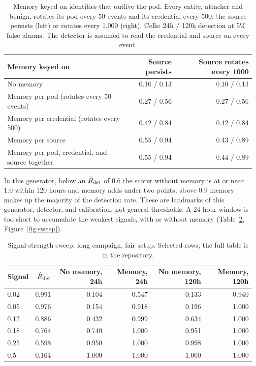 \documentclass[11pt,letterpaper]{article}
\begin{document}
\begin{table}[H]\centering\small
\begin{tabular}{lrr}
\toprule
Memory keyed on & Source persists & Source rotates every 1000 \\
\midrule
No memory & 0.10 / 0.13 & 0.10 / 0.13 \\
Memory per pod (rotates every 50 events) & 0.27 / 0.56 & 0.27 / 0.56 \\
Memory per credential (rotates every 500) & 0.42 / 0.84 & 0.42 / 0.84 \\
Memory per source & 0.55 / 0.94 & 0.43 / 0.89 \\
Memory per pod, credential, and source together & 0.55 / 0.94 & 0.44 / 0.89 \\
\bottomrule
\end{tabular}
\caption{Memory keyed on identities that outlive the pod. Every entity, attacker and benign, rotates its pod every 50 events and its credential every 500; the source persists (left) or rotates every 1,000 (right). Cells: 24h / 120h detection at 5\% false alarms. The detector is assumed to read the credential and source on every event.}\label{tab:keys}
\end{table}

In this generator, below an $\hat R_{\rm det}$ of 0.6 the scorer without memory is at or near 1.0 within 120 hours and memory adds under two points; above 0.9 memory makes up the majority of the detection rate. These are landmarks of this generator, detector, and calibration, not general thresholds. A 24-hour window is too short to accumulate the weakest signals, with or without memory (Table~\ref{tab:sweep}, Figure~\ref{fig:sweep}).

\begin{table}[H]\centering\small
\begin{tabular}{lrrrrr}
\toprule
Signal & $\hat R_{\rm det}$ & No memory, 24h & Memory, 24h & No memory, 120h & Memory, 120h \\
\midrule
0.02 & 0.991 & 0.104 & 0.547 & 0.133 & 0.940 \\
0.05 & 0.976 & 0.154 & 0.918 & 0.196 & 1.000 \\
0.12 & 0.886 & 0.432 & 0.999 & 0.634 & 1.000 \\
0.18 & 0.764 & 0.740 & 1.000 & 0.951 & 1.000 \\
0.25 & 0.598 & 0.950 & 1.000 & 0.998 & 1.000 \\
0.5 & 0.164 & 1.000 & 1.000 & 1.000 & 1.000 \\
\bottomrule
\end{tabular}
\caption{Signal-strength sweep, long campaign, fair setup. Selected rows; the full table is in the repository.}\label{tab:sweep}
\end{table}
\end{document}
